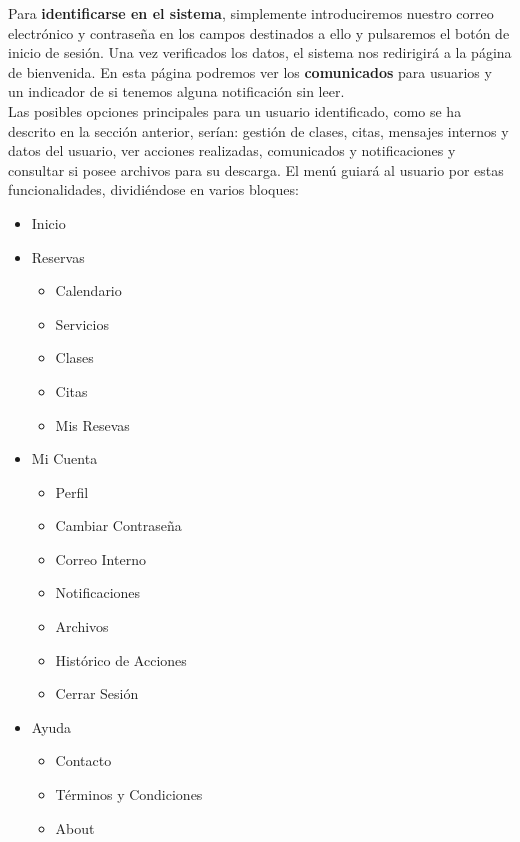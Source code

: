 Para \textbf{identificarse en el sistema}, simplemente introduciremos nuestro correo electrónico y contraseña en los campos destinados a ello y pulsaremos el botón de inicio de sesión. Una vez verificados los datos, el sistema nos redirigirá a la página de bienvenida. En esta página podremos ver los \textbf{comunicados} para usuarios y un indicador de si tenemos alguna notificación sin leer. \\

Las posibles opciones principales para un usuario identificado, como se ha descrito en la sección anterior, serían: gestión de clases, citas, mensajes internos y datos del usuario, ver acciones realizadas, comunicados y notificaciones y consultar si posee archivos para su descarga. El menú guiará al usuario por estas funcionalidades, dividiéndose en varios bloques: 

\begin{itemize}
\item Inicio
\item Reservas

\begin{itemize}
\item Calendario
\item Servicios
\item Clases
\item Citas
\item Mis Resevas
\end{itemize}

\item Mi Cuenta

\begin{itemize}
\item Perfil
\item Cambiar Contraseña
\item Correo Interno
\item Notificaciones
\item Archivos
\item Histórico de Acciones
\item Cerrar Sesión
\end{itemize}

\item Ayuda

\begin{itemize}
\item Contacto
\item Términos y Condiciones
\item About
\end{itemize}

\end{itemize}

